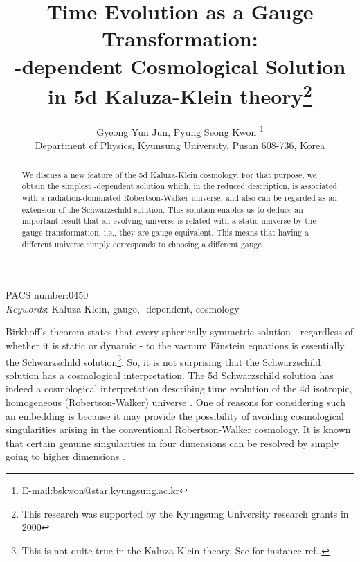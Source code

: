 \documentclass[a4paper,12pt]{article}
\begin{document}
\pagestyle{plain}
\title{Time Evolution as a Gauge Transformation: \\
\coordHE{}-dependent Cosmological Solution in 5d Kaluza-Klein
theory\footnote{This research was supported by the Kyungsung
University research grants in 2000}}
\author{Gyeong Yun Jun, Pyung Seong Kwon
\footnote{E-mail:bskwon@star.kyungsung.ac.kr}\\
{\small Department of Physics, Kyunsung University, Pusan 608-736,
Korea}}
\date{}
\maketitle
\thispagestyle{empty}
\begin{abstract}
We discuss a new feature of the 5d Kaluza-Klein cosmology. For
that purpose, we obtain the simplest \coordHE{}-dependent solution
which, in the reduced description, is associated with a
radiation-dominated Robertson-Walker universe, and also can be
regarded as an extension of the Schwarzschild solution. This
solution enables us to deduce an important result that an evolving
universe is related with a static universe by the gauge
transformation, i.e., they are gauge equivalent. This means that
having a different universe simply corresponds to choosing a
different gauge.
\end{abstract}
\medskip
\begin{center}
{PACS number:0450}\\
\medskip
{\em Keywords}: Kaluza-Klein, gauge, \coordHE{}-dependent, cosmology
\end{center}
\newpage
\baselineskip 8.5mm

\setcounter{page}{1}
 Birkhoff's theorem states that every spherically symmetric
 solution - regardless of whether it is static or dynamic - to the
 vacuum Einstein equations is essentially the Schwarzschild
 solution\footnote{This is not quite true in the Kaluza-Klein
 theory. See for instance ref.\cite{gro}.}. So, it is not 
surprising that
 the Schwarzschild solution has a cosmological interpretation. The
 5d Schwarzschild  solution has indeed a
 cosmological interpretation describing time evolution of the 4d
 isotropic, homogeneous (Robertson-Walker) universe \cite{beh}.
 One of reasons for considering such an embedding is
because it may provide the possibility of avoiding cosmological
singularities arising in the conventional Robertson-Walker
cosmology. It is known that certain genuine singularities in four
dimensions can be resolved by simply going to higher dimensions
\cite{gib}.
\end{document}
